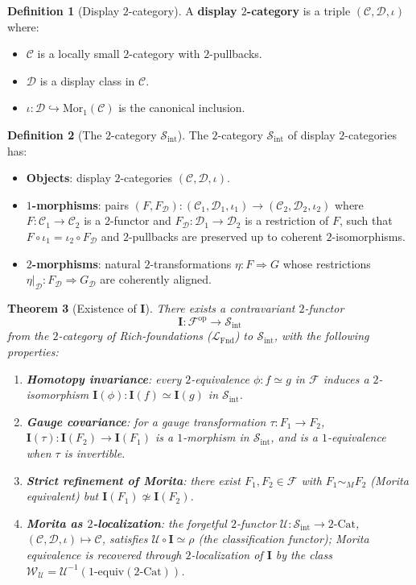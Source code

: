 \documentclass[11pt]{article}
\theoremstyle{plain}
\newtheorem{theorem}{Theorem}[section]
\theoremstyle{definition}
\newtheorem{definition}[theorem]{Definition}
\newcommand{\cS}{\mathcal{S}}
\newcommand{\cF}{\mathcal{F}}
\newcommand{\cC}{\mathcal{C}}
\newcommand{\cD}{\mathcal{D}}
\newcommand{\LFnd}{\mathcal{L}_{\mathrm{Fnd}}}
\newcommand{\Sint}{\cS_{\mathrm{int}}}
\newcommand{\Mor}{\mathrm{Mor}}
\newcommand{\Cat}{\mathrm{Cat}}
\newcommand{\II}{\mathbf{I}}
\newcommand{\cU}{\mathcal{U}}
\begin{document}
\begin{definition}[Display $2$-category]\label{def:display-2-cat}
A \textbf{display $2$-category} is a triple $(\cC, \cD, \iota)$ where:
\begin{itemize}
\item $\cC$ is a locally small $2$-category with $2$-pullbacks.
\item $\cD$ is a display class in $\cC$.
\item $\iota : \cD \hookrightarrow \Mor_1(\cC)$ is the canonical inclusion.
\end{itemize}
\end{definition}

\begin{definition}[The $2$-category $\Sint$]\label{def:Sint}
The $2$-category $\Sint$ of display $2$-categories has:
\begin{itemize}
\item \textbf{Objects}: display $2$-categories $(\cC, \cD, \iota)$.
\item \textbf{$1$-morphisms}: pairs $(F, F_\cD) : (\cC_1, \cD_1, \iota_1) \to (\cC_2, \cD_2, \iota_2)$ where $F : \cC_1 \to \cC_2$ is a $2$-functor and $F_\cD : \cD_1 \to \cD_2$ is a restriction of $F$, such that $F \circ \iota_1 = \iota_2 \circ F_\cD$ and $2$-pullbacks are preserved up to coherent $2$-isomorphisms.
\item \textbf{$2$-morphisms}: natural $2$-transformations $\eta : F \Rightarrow G$ whose restrictions $\eta|_\cD : F_\cD \Rightarrow G_\cD$ are coherently aligned.
\end{itemize}
\end{definition}

\begin{theorem}[Existence of $\II$]\label{thm:I-existence}
There exists a contravariant $2$-functor
\[ \II : \cF^{\mathrm{op}} \to \Sint \]
from the $2$-category of Rich-foundations ($\LFnd$) to $\Sint$, with the following properties:
\begin{enumerate}
\item[\textbf{(I-1)}] \textbf{Homotopy invariance}: every $2$-equivalence $\phi : f \simeq g$ in $\cF$ induces a $2$-isomorphism $\II(\phi) : \II(f) \simeq \II(g)$ in $\Sint$.
\item[\textbf{(I-2)}] \textbf{Gauge covariance}: for a gauge transformation $\tau : F_1 \to F_2$, $\II(\tau) : \II(F_2) \to \II(F_1)$ is a $1$-morphism in $\Sint$, and is a $1$-equivalence when $\tau$ is invertible.
\item[\textbf{(I-3)}] \textbf{Strict refinement of Morita}: there exist $F_1, F_2 \in \cF$ with $F_1 \sim_M F_2$ (Morita equivalent) but $\II(F_1) \not\simeq \II(F_2)$.
\item[\textbf{(I-4)}] \textbf{Morita as $2$-localization}: the forgetful $2$-functor $\cU : \Sint \to 2\text{-}\Cat$, $(\cC, \cD, \iota) \mapsto \cC$, satisfies $\cU \circ \II \simeq \rho$ (the classification functor); Morita equivalence is recovered through $2$-localization of $\II$ by the class $\mathcal{W}_\cU = \cU^{-1}(1\text{-equiv}(2\text{-}\Cat))$.
\end{enumerate}
\end{theorem}
\end{document}
